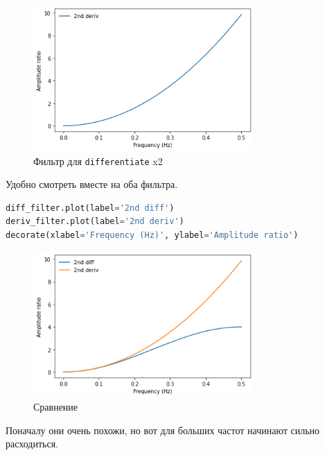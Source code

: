 \documentclass[a4paper,12pt]{report}
\begin{document}
    \begin{figure}[H]
        \centering
        \includegraphics[width=0.75\textwidth]{ex4_window_2.png}
        \caption{Фильтр для \texttt{differentiate} x2}
        \label{fig:ex4_window_2}
    \end{figure}

    Удобно смотреть вместе на оба фильтра.
    
\begin{lstlisting}[language=Python,caption=Сравнение]
diff_filter.plot(label='2nd diff')
deriv_filter.plot(label='2nd deriv')
decorate(xlabel='Frequency (Hz)', ylabel='Amplitude ratio')
\end{lstlisting}

    \begin{figure}[H]
        \centering
        \includegraphics[width=0.75\textwidth]{ex4_window_comparison.png}
        \caption{Сравнение}
        \label{fig:ex4_window_comparison}
    \end{figure}

    Поначалу они очень похожи, но вот для больших частот начинают сильно расходиться.

    
\end{document}
